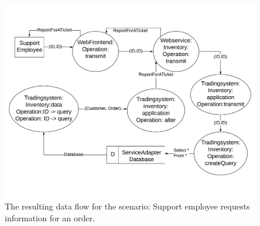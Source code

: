 \begin{figure}
\includegraphics[scale=0.8, angle = 90]{logos/DF_UC14.pdf}
\caption{The resulting data flow for the scenario: Support employee requests information for an order.}
\label{DF_UC14}
\end{figure}

